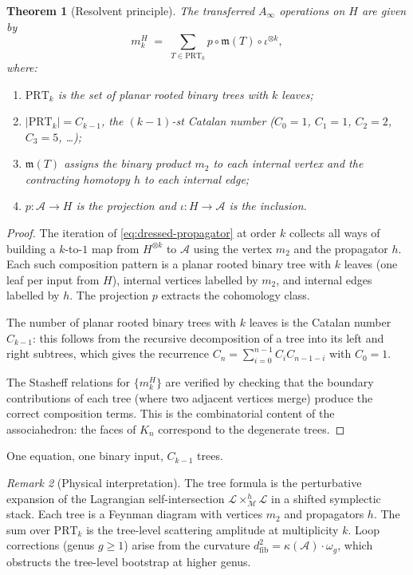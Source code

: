 \documentclass[11pt,reqno]{amsart}
\newtheorem{theorem}{Theorem}[section]
\theoremstyle{definition}
\theoremstyle{remark}
\newtheorem{remark}[theorem]{Remark}
\newcommand{\cA}{\mathcal{A}}
\newcommand{\cL}{\mathcal{L}}
\newcommand{\cM}{\mathcal{M}}
\newcommand{\Ainf}{A_{\infty}}
\numberwithin{equation}{section}
\providecommand{\ClaimStatusProvedHere}{}
\begin{document}
\begin{theorem}[Resolvent principle]
\label{thm:resolvent}
\ClaimStatusProvedHere{}
The transferred $\Ainf$ operations on $H$ are given by
\begin{equation}\label{eq:tree-formula}
  m_k^H
  \;=\;
  \sum_{T \in \mathrm{PRT}_k}
  p \circ \mathfrak{m}(T) \circ \iota^{\otimes k},
\end{equation}
where:
\begin{enumerate}[label=(\roman*)]
\item $\mathrm{PRT}_k$ is the set of planar rooted binary trees
  with $k$ leaves;
\item $|\mathrm{PRT}_k| = C_{k-1}$, the $(k-1)$-st Catalan number
  ($C_0 = 1$, $C_1 = 1$, $C_2 = 2$, $C_3 = 5$, \ldots);
\item $\mathfrak{m}(T)$ assigns the binary product $m_2$ to each
  internal vertex and the contracting homotopy $h$ to each
  internal edge;
\item $p \colon \cA \to H$ is the projection and
  $\iota \colon H \to \cA$ is the inclusion.
\end{enumerate}
\end{theorem}

\begin{proof}
The iteration of \eqref{eq:dressed-propagator} at order $k$ collects
all ways of building a $k$-to-$1$ map from $H^{\otimes k}$ to
$\cA$ using the vertex $m_2$ and the propagator $h$.  Each such
composition pattern is a planar rooted binary tree with $k$
leaves (one leaf per input from $H$), internal vertices labelled
by $m_2$, and internal edges labelled by $h$.  The projection $p$
extracts the cohomology class.

The number of planar rooted binary trees with $k$ leaves is the
Catalan number $C_{k-1}$: this follows from the recursive
decomposition of a tree into its left and right subtrees,
which gives the recurrence
$C_n = \sum_{i=0}^{n-1} C_i C_{n-1-i}$ with $C_0 = 1$.

The Stasheff relations for $\{m_k^H\}$ are verified by
checking that the boundary contributions of each tree (where
two adjacent vertices merge) produce the correct
composition terms.  This is the combinatorial content of the
associahedron: the faces of $K_n$ correspond to the degenerate
trees.
\end{proof}

One equation, one binary input, $C_{k-1}$ trees.

\begin{remark}[Physical interpretation]
\label{rem:physical-tree-formula}
The tree formula is the perturbative expansion of the Lagrangian
self-intersection $\cL \times_{\cM}^h \cL$ in a shifted symplectic
stack.  Each tree is a Feynman diagram with vertices $m_2$ and
propagators $h$.  The sum over $\mathrm{PRT}_k$ is the tree-level
scattering amplitude at multiplicity $k$.  Loop corrections
(genus $g \geq 1$) arise from the curvature
$d_{\mathrm{fib}}^2 = \kappa(\cA) \cdot \omega_g$, which obstructs
the tree-level bootstrap at higher genus.
\end{remark}
\end{document}
